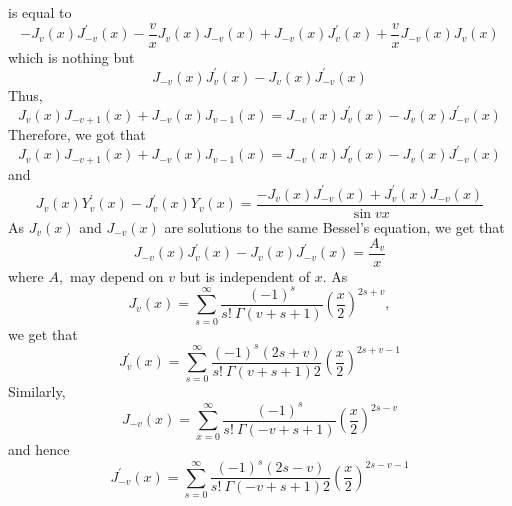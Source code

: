 \documentclass{article}
\begin{document}
\begin{flushleft}
is equal to
$$-J_{v}(x) J_{-v}^{\prime}(x)-\frac{v}{x} J_{v}(x) J_{-v}(x)+J_{-v}(x) J_{v}^{\prime}(x)+\frac{v}{x} J_{-v}(x) J_{v}(x)$$ 
which is nothing but
$$J_{-v}(x) J_{v}^{\prime}(x)-J_{v}(x) J_{-v}^{\prime}(x)$$
Thus, 
$$J_{v}(x) J_{-v+1}(x)+J_{-v}(x) J_{v-1}(x)=J_{-v}(x) J_{v}^{\prime}(x)-J_{v}(x) J_{-v}^{\prime}(x)$$
Therefore, we got that 
$$J_{v}(x) J_{-v+1}(x)+J_{-v}(x) J_{v-1}(x)=J_{-v}(x) J_{v}^{\prime}(x)-J_{v}(x) J_{-v}^{\prime}(x)$$ 
and
$$J_{v}(x) Y_{v}^{\prime}(x)-J_{v}^{\prime}(x) Y_{v}(x)=\frac{-J_{v}(x) J_{-v}^{\prime}(x)+J_{v}^{\prime}(x) J_{-v}(x)}{\sin v x}$$
As $J_{v}(x)$ and $J_{-v}(x)$ are solutions to the same Bessel's equation, we get that
$$J_{-v}(x) J_{v}^{\prime}(x)-J_{v}(x) J_{-v}^{\prime}(x)=\frac{A_{v}}{x}$$ 
where $A,$ may depend
on $v$ but is independent of $x$.
As 
$$J_{v}(x)=\sum_{s=0}^{\infty} \frac{(-1)^{s}}{s ! \  \Gamma(v+s+1)}\left(\frac{x}{2}\right)^{2 s+v},$$
we get that 
$$J_{v}^{\prime}(x)=\sum_{s=0}^{\infty} \frac{(-1)^{s}(2 s+v)}{s ! \  \Gamma(v+s+1) 2}\left(\frac{x}{2}\right)^{2 s+v-1}$$
Similarly, 
$$J_{-v}(x)=\sum_{x=0}^{\infty} \frac{(-1)^{s}}{s ! \  \Gamma(-v+s+1)}\left(\frac{x}{2}\right)^{2 s-v}$$ 
and hence
$$J_{-v}^{\prime}(x)=\sum_{s=0}^{\infty} \frac{(-1)^{s}(2 s-v)}{s ! \  \Gamma(-v+s+1) 2}\left(\frac{x}{2}\right)^{2 s-v-1}$$


\end{flushleft}
\end{document}
